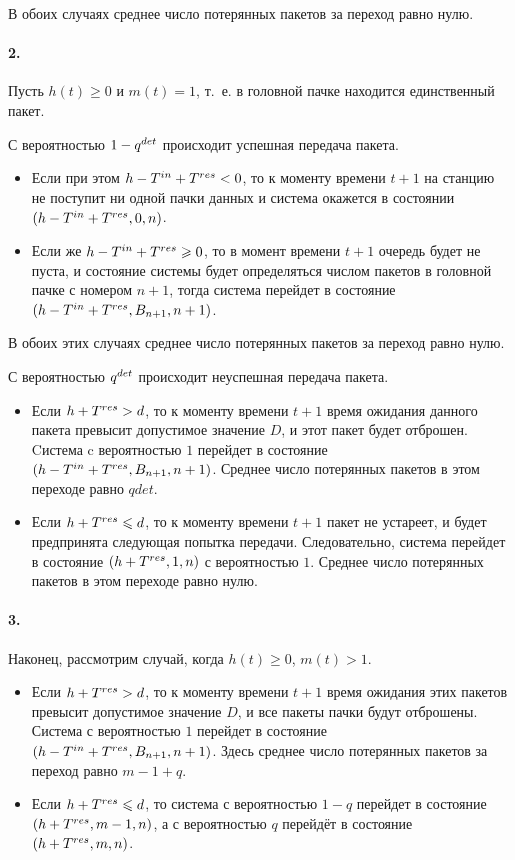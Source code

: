 В обоих случаях среднее число потерянных пакетов за переход равно нулю.
\paragraph{2.} Пусть $h(t) \ge 0$ и $m(t) = 1$, т.~е. в головной пачке находится единственный пакет.

С вероятностью $1 - q^{det}$ происходит успешная передача пакета.

\begin{itemize}
\item Если при этом $h - T^{in} + T^{res} < 0$, то к моменту времени $t + 1$ на станцию не поступит ни одной пачки данных и система окажется в состоянии $(h - T^{in} + T^{res}, 0, n)$.
\item Если же $h - T^{in} + T^{res} \geqslant 0$, то в момент времени $t + 1$ очередь будет не пуста, и состояние системы будет определяться числом пакетов в головной пачке с номером  $n + 1$, тогда система перейдет в состояние $(h - T^{in} + T^{res}, B_{n+1}, n+1)$.
\end{itemize}

В обоих этих случаях среднее число потерянных пакетов за переход равно нулю.

С вероятностью $q^{det}$ происходит неуспешная передача пакета.

\begin{itemize}
\item Если $h + T^{res} > d$, то к моменту времени $t + 1$ время ожидания данного пакета  превысит допустимое значение $D$, и этот пакет будет отброшен. Cистема c вероятностью $1$ перейдет в состояние $(h - T^{in} + T^{res}, B_{n+1}, n + 1)$. Среднее число потерянных пакетов в этом переходе равно $qdet$.
\item Если $h + T^{res} \leqslant d$, то к моменту времени $t + 1$ пакет не устареет, и будет предпринята следующая попытка передачи. Следовательно, система перейдет в состояние $(h + T^{res}, 1, n)$ с вероятностью $1$. Среднее число потерянных пакетов в этом переходе равно нулю.
\end{itemize}

\paragraph{3.} Наконец, рассмотрим случай, когда $h(t) \geqslant 0$, $m(t) > 1$. 

\begin{itemize}
\item Если $h + T^{res} > d$, то к моменту времени $t + 1$ время ожидания этих пакетов превысит допустимое значение $D$, и все пакеты пачки будут отброшены. Система с вероятностью $1$ перейдет в состояние $(h - T^{in} + T^{res}, B_{n+1}, n+1)$. Здесь среднее число потерянных пакетов за переход равно $m - 1 + q$.
\item Если $h + T^{res} \leqslant d$, то система с вероятностью $1 - q$ перейдет в состояние $(h + T^{res}, m - 1, n)$, а с вероятностью $q$ перейдёт в состояние $(h + T^{res}, m, n)$. 
\end{itemize}

